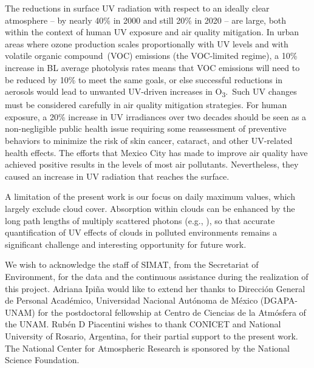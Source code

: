 \documentclass[journal=jacsat,manuscript=article]{achemso}
\begin{document}
The reductions in surface UV radiation with respect to an ideally clear
atmosphere -- by nearly 40\% in 2000 and still 20\% in 2020 -- are
large, both within the context of human UV exposure and air quality
mitigation. In urban areas where ozone production scales proportionally
with UV levels and with volatile organic compound~(VOC) emissions (the
VOC-limited regime), a 10\% increase in BL average photolysis rates
means that VOC emissions will need to be reduced by 10\% to meet the
same goals, or else successful reductions in aerosols would lead to
unwanted UV-driven increases in O\textsubscript{3}.~Such UV changes must
be considered carefully in air quality mitigation strategies. For human
exposure, a 20\% increase in UV irradiances over two decades should be
seen as a non-negligible public health issue requiring some reassessment
of preventive behaviors to minimize the risk of skin cancer, cataract,
and other UV-related health effects. The efforts that Mexico City has
made to improve air quality have achieved positive results in the levels
of most air pollutants. Nevertheless, they caused an increase in UV
radiation that reaches the surface.

A limitation of the present work is our focus on daily maximum values,
which largely exclude cloud cover. Absorption within clouds can be
enhanced by the long path lengths of multiply scattered photons (e.g.,
\citet{Mayer_1998}), so that accurate quantification of UV
effects of clouds in polluted environments remains a significant
challenge and interesting opportunity for future work.







\begin{acknowledgement}
  We wish to acknowledge the staff of SIMAT, from the Secretariat of
  Environment, for the data and the continuous assistance during the
  realization of this project. Adriana Ipiña would like to extend her
  thanks to Dirección General de Personal Académico, Universidad
  Nacional Autónoma de México (DGAPA-UNAM) for the postdoctoral fellowship
  at Centro de Ciencias de la Atmósfera of the UNAM. Rubén D Piacentini
  wishes to thank CONICET and National University of Rosario, Argentina,
  for their partial support to the present work. The National Center for
  Atmospheric Research is sponsored by the National Science Foundation.
\end{acknowledgement}
\end{document}
